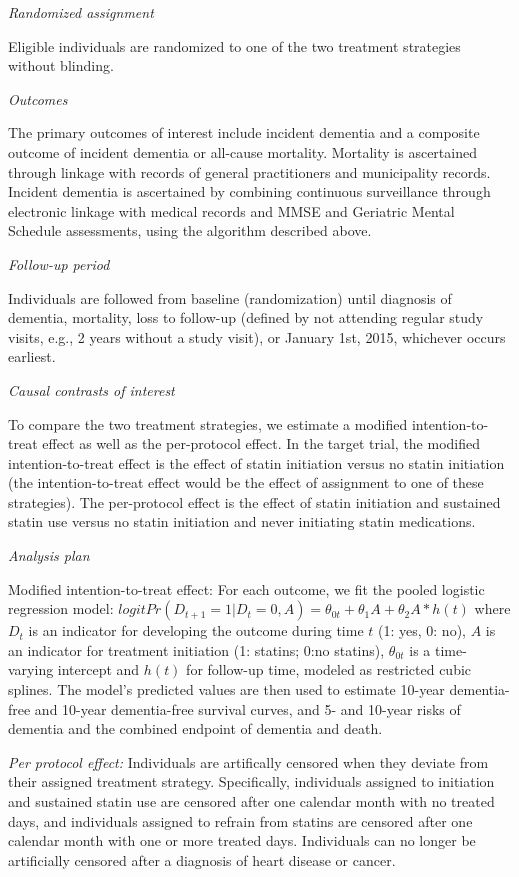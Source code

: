 \documentclass[
]{book}
\begin{document}
\emph{Randomized assignment}

Eligible individuals are randomized to one of the two treatment strategies without blinding.

\emph{Outcomes}

The primary outcomes of interest include incident dementia and a composite outcome of incident dementia or all-cause mortality. Mortality is ascertained through linkage with records of general practitioners and municipality records. Incident dementia is ascertained by combining continuous surveillance through electronic linkage with medical records and MMSE and Geriatric Mental Schedule assessments, using the algorithm described above.

\emph{Follow-up period}

Individuals are followed from baseline (randomization) until diagnosis of dementia, mortality, loss to follow-up (defined by not attending regular study visits, e.g., 2 years without a study visit), or January 1st, 2015, whichever occurs earliest.

\emph{Causal contrasts of interest}

To compare the two treatment strategies, we estimate a modified intention-to-treat effect as well as the per-protocol effect. In the target trial, the modified intention-to-treat effect is the effect of statin initiation versus no statin initiation (the intention-to-treat effect would be the effect of assignment to one of these strategies). The per-protocol effect is the effect of statin initiation and
sustained statin use versus no statin initiation and never initiating statin medications.

\emph{Analysis plan}

Modified intention-to-treat effect: For each outcome, we fit the pooled logistic regression model: \(logitPr(D_{t+1} = 1|D_t = 0, A) = \theta_{0t} + \theta_{1}A + \theta_{2}A * h(t)\) where \(D_t\) is an indicator for developing the outcome during time \(t\) (1: yes, 0: no), \(A\) is an indicator for treatment initiation (1: statins; 0:no statins), \(\theta_{0t}\) is a time-varying intercept and \(h(t)\) for follow-up time, modeled as restricted cubic splines. The model's predicted values are then used to estimate 10-year dementia-free and 10-year dementia-free survival curves, and 5- and 10-year risks of dementia and the combined endpoint of dementia and death.

\emph{Per protocol effect:} Individuals are artifically censored when they deviate from their assigned treatment strategy. Specifically, individuals assigned to initiation and sustained statin use are censored after one calendar month with no treated days, and individuals assigned to refrain from statins are censored after one calendar month with one or more treated days. Individuals can no longer be artificially censored after a diagnosis of heart disease or cancer.
\end{document}
